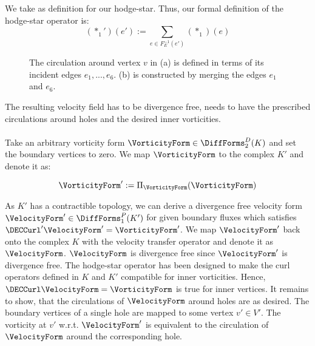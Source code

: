 We take  as definition for our hodge-star. 
Thus, our formal definition of the hodge-star operator is:
\begin{equation}
(*_1')(e') := \sum_{e \in F_E^{-1}(e')} (*_1)(e)
\end{equation}

\begin{figure}[h!]
	\begin{minipage}[b]{0.5 \linewidth}
		\centering
		\subfigure[]{
					\label{sfig:CircNonCollapsed}
			      	}
	\end{minipage}
	\begin{minipage}[b]{0.5 \linewidth}
		\centering
		\subfigure[]{
					\label{sfig:CircCollapsed}
			      	}
	\end{minipage}		
	\caption[Circulation around a vertex $v$ before and after merging]
			{The circulation around vertex $v$ in (a) is defined in terms of its incident edges
			 $e_1 , ... , e_6$. (b) is constructed by merging the edges $e_1$ and $e_6$.}
	\label{fig:VorticityCollidingEdges}
\end{figure}

\newpage
{}
The resulting velocity field has to be divergence free, needs to have the prescribed circulations around holes and the desired inner vorticities.

\paragraph*{}
Take an arbitrary vorticity form $\VorticityForm \in \DiffForms^D_2(K)$ and set the boundary vertices to zero.
We map $\VorticityForm$ to the complex $K'$ and denote it as:

\begin{equation}
\VorticityForm' := \Pi_\VorticityForm(\VorticityForm)
\end{equation}

As $K'$ has a contractible topology, we can derive a divergence free velocity form $\VelocityForm' \in \DiffForms^P_1(K')$ for given boundary fluxes
which satisfies $\DECCurl'\VelocityForm' = \VorticityForm'$.
We map $\VelocityForm'$ back onto the complex $K$ with the velocity transfer operator and denote it as $\VelocityForm$.
$\VelocityForm$ is divergence free since $\VelocityForm'$ is divergence free.
The hodge-star operator has been designed to make the curl operators defined in $K$ and $K'$ compatible for inner vorticities.
Hence,  $\DECCurl \VelocityForm = \VorticityForm$ is true for inner vertices.
It remains to show, that the circulations of $\VelocityForm$ around holes are as desired.
The boundary vertices of a single hole are mapped to some vertex $v' \in V'$.
The vorticity at $v'$ w.r.t. $\VelocityForm'$ is equivalent to the circulation of $\VelocityForm$ around the corresponding hole. 

